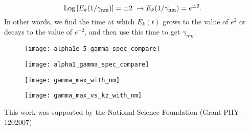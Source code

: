 \documentclass[letter,scriptaddress,twocolumn, prl,showkeys]{revtex4}
\def\beq{\begin{equation}}
\def\eeq{\end{equation}}
\begin{document}
\beq
\label{fourth_gamma_cond}
 {\rm{Log}} \left[ E_k(1/\gamma_{\rm{nm}})\right] = \pm 2 \ \rightarrow E_k(1/\gamma_{\rm{nm}}) = e^{\pm 2}.
\eeq
In other words, we find the time at which $E_k(t)$ grows to the value of $e^2$ or decays to the value of $e^{-2}$, and then use this time to get $\gamma_{nm}$.

\begin{figure}
\centerline{\texttt{[image: alpha1e-5\_gamma\_spec\_compare]}}
\caption{}
\label{alpha1e-5_gamma_spec_compare}
\end{figure}

\begin{figure}
\centerline{\texttt{[image: alpha1\_gamma\_spec\_compare]}}
\caption{}
\label{alpha1_gamma_spec_compare}
\end{figure}

\begin{figure}
\centerline{\texttt{[image: gamma\_max\_with\_nm]}}
\caption{}
\label{gamma_max_with_nm}
\end{figure}

\begin{figure}
\centerline{\texttt{[image: gamma\_max\_vs\_kz\_with\_nm]}}
\caption{}
\label{gamma_max_vs_kz_with_nm}
\end{figure}


This work was supported by the National Science Foundation (Grant PHY-1202007)


%

\end{document}

